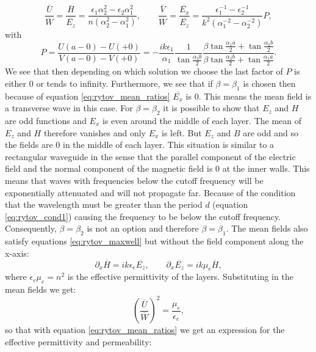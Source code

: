 \begin{equation}
    \label{eq:rytov_mean_ratios}
    \frac{\overline{U}}{\overline{W}} = \frac{\overline{H}}{\overline{E_z}} = \frac{\epsilon_1 \alpha_2^2 - \epsilon_2 \alpha_1^2}{n\left(\alpha_2^2-\alpha_1^2 \right)},
    \qquad
    \frac{\overline{V}}{\overline{W}} = \frac{\overline{E_x}}{\overline{E_z}} = \frac{\epsilon_1^{-1} - \epsilon_2^{-1}}{k^2\left(\alpha_1^{-2} - \alpha_2^{-2} \right)}P,
\end{equation}
with
\begin{equation}
    P = \frac{U(a-0)-U(+0)}{V(a-0)-V(+0)} = -\frac{ik\epsilon_1}{\alpha_1}\frac{1}{\tan \frac{\alpha_2 b}{2}}\frac{\beta \tan \frac{\alpha_1 a}{2} + \tan \frac{\alpha_2 b}{2}}{\beta \tan \frac{\alpha_2 b}{2} + \tan \frac{\alpha_1 a}{2}}.
\end{equation}
We see that then depending on which solution we choose the last factor of $P$ is either $0$ or tends to infinity. Furthermore, we see that if $\beta = \beta_1$ is chosen then because of equation \ref{eq:rytov_mean_ratios} $\overline{E_x}$ is $0$. This means the mean field is a transverse wave in this case. For $\beta = \beta_2$ it is possible to show that $E_z$ and $H$ are odd functions and $E_x$ is even around the middle of each layer. The mean of $E_z$ and $H$ therefore vanishes and only $E_x$ is left. But $E_z$ and $B$ are odd and so the fields are $0$ in the middle of each layer. This situation is similar to a rectangular waveguide in the sense that the parallel component of the electric field and the normal component of the magnetic field is $0$ at the inner walls. This means that waves with frequencies below the cutoff frequency will be exponentially attenuated and will not propagate far. Because of the condition that the wavelength must be greater than the period $d$ (equation \ref{eq:rytov_cond1}) causing the frequency to be below the cutoff frequency. Consequently, $\beta = \beta_2$ is not an option and therefore $\beta = \beta_1$. The mean fields also satisfy equations \ref{eq:rytov_maxwell} but without the field component along the x-axis:
\begin{equation}
    \label{eq:rytov_maxwell_reduced}
    \partial_x \overline{H} = ik \epsilon_e \overline{E_z},
    \qquad
    \partial_x \overline{E_z} = ik \mu_e \overline{H},
\end{equation}
where $\epsilon_e \mu_e =n^2$ is the effective permittivity of the layers. Substituting in the mean fields we get:
\begin{equation}
    \left(\frac{\overline{U}}{\overline{W}}\right)^2 = \frac{\mu_e}{\epsilon_e}, 
\end{equation} so that with equation \ref{eq:rytov_mean_ratios} we get an expression for the effective permittivity and permeability:
